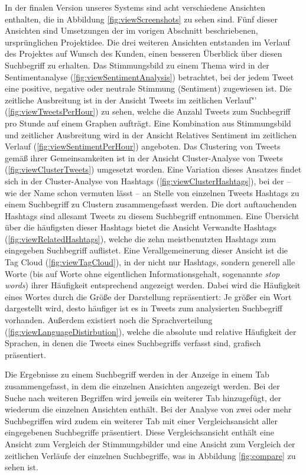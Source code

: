 In der finalen Version unseres Systems sind acht verschiedene Ansichten enthalten, die in Abbildung \ref{fig:viewScreenshots} zu sehen sind. Fünf dieser Ansichten sind Umsetzungen der im vorigen Abschnitt beschriebenen, ursprünglichen Projektidee. Die drei weiteren Ansichten entstanden im Verlauf des Projektes auf Wunsch des Kunden, einen besseren Überblick über diesen Suchbegriff zu erhalten.
Das Stimmungsbild zu einem Thema wird in der \glqq Sentimentanalyse\grqq{} (\ref{fig:viewSentimentAnalysis}) betrachtet, bei der jedem Tweet eine positive, negative oder neutrale Stimmung (Sentiment) zugewiesen ist. Die zeitliche Ausbreitung ist in der Ansicht \glqq Tweets im zeitlichen Verlauf"' (\ref{fig:viewTweetsPerHour}) zu sehen, welche die Anzahl Tweets zum Suchbegriff pro Stunde auf einem Graphen aufträgt. Eine Kombination aus Stimmungsbild und zeitlicher Ausbreitung wird in der Ansicht \glqq Relatives Sentiment im zeitlichen Verlauf\grqq{} (\ref{fig:viewSentimentPerHour}) angeboten.
Das Clustering von Tweets gemäß ihrer Gemeinsamkeiten ist in der Ansicht \glqq Cluster-Analyse von Tweets\grqq{} (\ref{fig:viewClusterTweets}) umgesetzt worden. Eine Variation dieses Ansatzes findet sich in der \glqq Cluster-Analyse von Hashtags\grqq{} (\ref{fig:viewClusterHashtags}), bei der -- wie der Name schon vermuten lässt -- an Stelle von einzelnen Tweets Hashtags zu einem Suchbegriff zu Clustern zusammengefasst werden.
Die dort auftauchenden Hashtags sind allesamt Tweets zu diesem Suchbegriff entnommen. Eine Übersicht über die häufigsten dieser Hashtags bietet die Ansicht \glqq Verwandte Hashtags\grqq{} (\ref{fig:viewRelatedHashtags}), welche die zehn meistbenutzten Hashtags zum eingegeben Suchbegriff auflistet. Eine Verallgemeinerung dieser Ansicht ist die \glqq Tag Cloud\grqq{} (\ref{fig:viewTagCloud}), in der nicht nur Hashtags, sondern generell alle Worte (bis auf Worte ohne eigentlichen Informationsgehalt, sogenannte \textit{stop words}) ihrer Häufigkeit entsprechend angezeigt werden. Dabei wird die Häufigkeit eines Wortes durch die Größe der Darstellung repräsentiert: Je größer ein Wort dargestellt wird, desto häufiger ist es in Tweets zum analysierten Suchbegriff vorhanden. Außerdem existiert noch die \glqq Sprachverteilung\grqq{} (\ref{fig:viewLanguageDistirbution}), welche die absolute und relative Häufigkeit der Sprachen, in denen die Tweets eines Suchbegriffs verfasst sind, grafisch präsentiert.

Die Ergebnisse zu einem Suchbegriff werden in der Anzeige in einem Tab zusammengefasst, in dem die einzelnen Ansichten angezeigt werden. Bei der Suche nach weiteren Begriffen wird jeweils ein weiterer Tab hinzugefügt, der wiederum die einzelnen Ansichten enthält. Bei der Analyse von zwei oder mehr Suchbegriffen wird zudem ein weiterer Tab mit einer Vergleichsansicht aller eingegebenen Suchbegriffe präsentiert. Diese Vergleichsansicht enthält eine Ansicht zum Vergleich der Stimmungsbilder und eine Ansicht zum Vergleich der zeitlichen Verläufe der einzelnen Suchbegriffe, was in Abbildung \ref{fig:compare} zu sehen ist.

